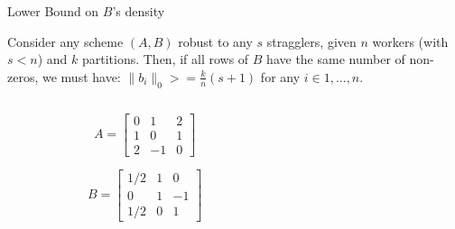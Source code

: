 \documentclass{beamer}
\begin{document}
\begin{frame}{Lower Bound on $B$’s density}

\begin{theorem}
    Consider any scheme $(A, B)$ robust to any $s$ stragglers, given $n$ workers (with $s < n$) and $k$ partitions. Then, if all rows of $B$ have the same number of non-zeros, we must have: $\lVert b_i \rVert _0 >= \frac{k}{n}(s + 1)$ for any $i \in {1, \dots, n}$.
\end{theorem}

\begin{columns}

\begin{column}{.5\linewidth}
        
\begin{Example}
    \[A = \begin{bmatrix}
        0 & 1 & 2 \\
        1 & 0 & 1 \\
        2 & -1 & 0
    \end{bmatrix}\]
    
    \[B = \begin{bmatrix}
        1/2 & 1 & 0 \\
        0 & 1 & -1 \\
        1/2 & 0 & 1
    \end{bmatrix}\]
\end{Example}
    
\end{column}

\begin{column}{.5\linewidth}


\end{column}
\end{columns}
\end{frame}
\end{document}
